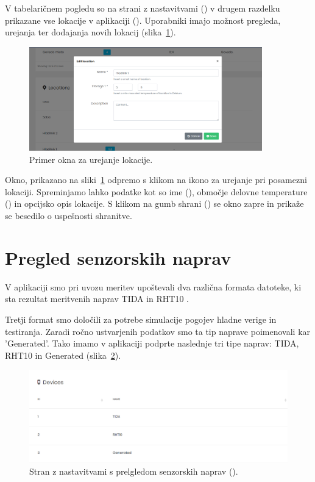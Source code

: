 \documentclass[a4paper, 12pt]{book}
\begin{document}
V tabelaričnem pogledu so na strani z nastavitvami () v drugem razdelku prikazane vse lokacije v aplikaciji (). Uporabniki imajo možnost pregleda, urejanja ter dodajanja novih lokacij (slika~\ref{ss-settings-location}).


\begin{figure}[h]
\begin{center}
\includegraphics[width=0.9\textwidth]{slike/location_edit.png}
\end{center}
\caption{Primer okna za urejanje lokacije.}
\label{ss-settings-location}
\end{figure}

Okno, prikazano na sliki~\ref{ss-settings-location} odpremo s klikom na ikono za urejanje pri posamezni lokaciji. Spreminjamo lahko podatke kot so ime (), območje delovne temperature () in opcijsko opis lokacije. S klikom na gumb shrani () se okno zapre in prikaže se besedilo o uspešnosti shranitve.


\clearpage


\section{Pregled senzorskih naprav}

V aplikaciji smo pri uvozu meritev upoštevali dva različna formata datoteke, ki sta rezultat meritvenih naprav TIDA \cite{dialoger-tida} in RHT10 \cite{rht10-dialogger}.

Tretji format smo določili za potrebe simulacije pogojev hladne verige in testiranja. Zaradi ročno ustvarjenih podatkov smo ta tip naprave poimenovali kar 'Generated'.
Tako imamo v aplikaciji podprte naslednje tri tipe naprav: TIDA, RHT10 in Generated (slika~\ref{ss-settings-devices}).

\begin{figure}[h]
\begin{center}
\includegraphics[width=\textwidth]{slike/devices.png}
\end{center}
\caption{Stran z nastavitvami s prelgledom senzorskih naprav ().}
\label{ss-settings-devices}
\end{figure}
\end{document}
